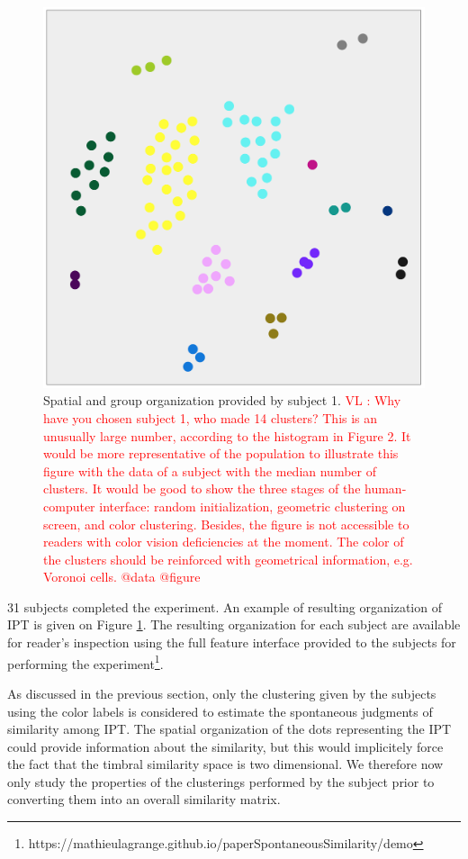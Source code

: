\documentclass{article}
\makeatletter
\newcommand*{\eg}{e.g.\@\xspace}
\newcommand{\ipt}{IPT\xspace}
\newcommand{\vl}[1]{\textcolor{red}{VL : #1}}
\makeatother
\begin{document}
\begin{figure}
\center
\includegraphics[width = \textwidth]{figures/xp2example.png}
\caption{Spatial and group organization provided by subject 1.
\vl{
Why have you chosen subject 1, who made 14 clusters?
This is an unusually large number, according to the
histogram in Figure 2.
It would be more representative of the population to illustrate this figure
with the data of a subject with the median number of clusters.
It would be good to show the three stages of the human-computer interface:
random initialization,
geometric clustering on screen,
and color clustering.
Besides, the figure is not accessible to readers with
color vision deficiencies at the moment.
The color of the clusters should be reinforced with
geometrical information, \eg{} Voronoi cells.
@data @figure}}
\label{fig:xp2display}
\end{figure}

31 subjects completed the experiment. An example of resulting organization of \ipt is given on Figure \ref{fig:xp2display}. The resulting organization for each subject are available for reader's inspection using the full feature interface provided to the subjects for performing the experiment\footnote{https://mathieulagrange.github.io/paperSpontaneousSimilarity/demo}.

As discussed in the previous section, only the clustering given by the subjects using the color labels is considered to estimate the spontaneous judgments of similarity among \ipt. The spatial organization of the dots representing the \ipt could provide information about the similarity, but this would implicitely force the fact that the timbral similarity space is two dimensional. We therefore now only study the properties of the clusterings performed by the subject prior to converting them into an overall similarity matrix.
\end{document}
